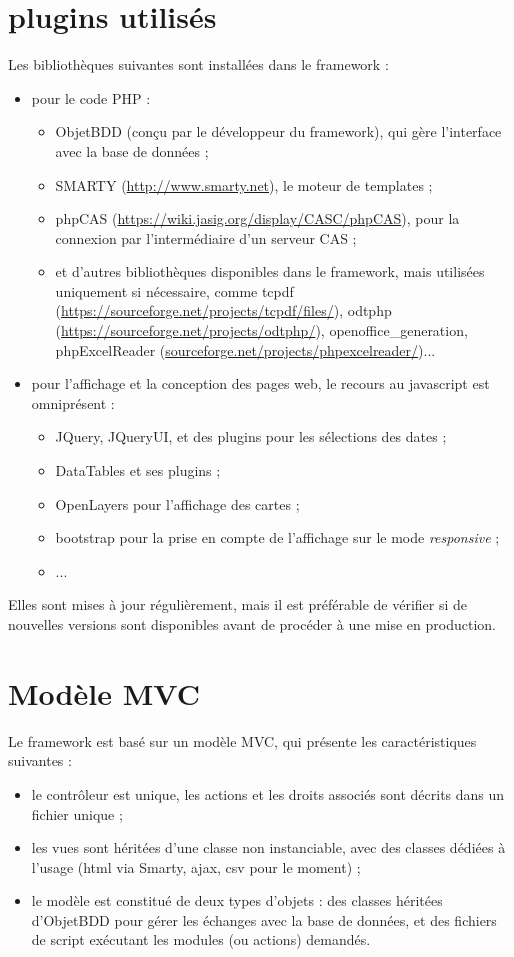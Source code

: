 \section{plugins utilisés}
Les bibliothèques suivantes sont installées dans le framework :
\begin{itemize}
\item pour le code PHP :
\begin{itemize}
\item ObjetBDD (conçu par le développeur du framework), qui gère l'interface avec la base de données ;
\item SMARTY (\url{http://www.smarty.net}), le moteur de templates ;
\item phpCAS (\url{https://wiki.jasig.org/display/CASC/phpCAS}), pour la connexion par l'intermédiaire d'un serveur CAS ;
\item et d'autres bibliothèques disponibles dans le framework, mais utilisées uniquement si nécessaire, comme tcpdf (\url{https://sourceforge.net/projects/tcpdf/files/}), odtphp (\url{https://sourceforge.net/projects/odtphp/}), openoffice\_generation, phpExcelReader (\url{sourceforge.net/projects/phpexcelreader/})...
\end{itemize}
\item pour l'affichage et la conception des pages web, le recours au javascript est omniprésent :
\begin{itemize}
\item JQuery, JQueryUI, et des plugins pour les sélections des dates ;
\item DataTables et ses plugins ;
\item OpenLayers pour l'affichage des cartes ;
\item bootstrap pour la prise en compte de l'affichage sur le mode \textit{responsive} ;
\item ...

\end{itemize}
\end{itemize}

Elles sont mises à jour régulièrement, mais il est préférable de vérifier si de nouvelles versions sont disponibles avant de procéder à une mise en production.

\section{Modèle MVC}

Le framework est basé sur un modèle MVC, qui présente les caractéristiques suivantes :
\begin{itemize}
\item le contrôleur est unique, les actions et les droits associés sont décrits dans un fichier unique ;
\item les vues sont héritées d'une classe non instanciable, avec des classes dédiées à l'usage (html via Smarty, ajax, csv pour le moment) ;
\item le modèle est constitué de deux types d'objets : des classes héritées d'ObjetBDD pour gérer les échanges avec la base de données, et des fichiers de script exécutant les modules (ou actions) demandés.
\end{itemize}

